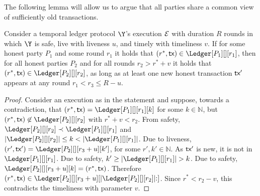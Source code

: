 \appsection[Analysis]\label{sec:analysis}

The following lemma will allow us to argue that all parties share a common
view of sufficiently old transactions.

\begin{lemma}\label{lem:past-perfect}
  Consider a temporal ledger protocol $\Y$'s
  execution $\mathcal{E}$ with duration $R$ rounds in which $\Y$ is
  safe, live with liveness $u$, and timely with timeliness $v$.
  If for some honest party $P_1$ and some round $r_1$ it holds that
  $(r^*, \tx) \in \Ledger[P_1][][r_1]$, then
  for all honest parties $P_2$ and for all rounds $r_2 > r^* + v$
  it holds that
  $(r^*, \tx) \in \Ledger[P_2][][r_2]$,
  as long as at least one new honest transaction $\textsf{tx}'$ appears at
  any round $r_1 < r_3 \leq R - u$.
\end{lemma}
\begin{proof}
  Consider an execution as in the statement and suppose, towards a contradiction,
  that $(r^*, \tx) = \Ledger[P_1][][r_1][k]$ for some $k \in \mathbb{N}$,
  but $(r^*, \tx) \not\in \Ledger[P_2][][r_2]$
  with $r^* + v < r_2$.
  From safety,
  $\Ledger[P_2][][r_2] \prec \Ledger[P_1][][r_1]$ and
  $|\Ledger[P_2][][r_2]| \leq k < |\Ledger[P_1][][r_1]|$.
  Due to liveness, $(r', \tx') = \Ledger[P_2][][r_3 + u][k']$,
  for some $r', k' \in \mathbb{N}$.
  As $\textsf{tx}'$ is new, it is not in $\Ledger[P_1][][r_1]$.
  Due to safety, $k' \geq |\Ledger[P_1][][r_1]| > k$.
  Due to safety, $\Ledger[P_2][][r_3 + u][k] = (r^*, \tx)$.
  Therefore
  $(r^*, \tx) \in \Ledger[P_2][][r_3 + u][|\Ledger[P_2][][r_2]|{:}]$.
  Since $r^* < r_2 - v$, this contradicts the timeliness with parameter $v$.\Qed
\end{proof}

